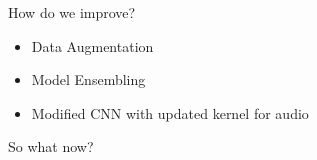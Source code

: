 \begin{frame}{How do we improve?}
    \begin{itemize}
        \item Data Augmentation
        \item Model Ensembling
        \item Modified CNN with updated kernel for audio
    \end{itemize}    
\end{frame}

%

\begin{frame}{So what now?}
\end{frame}
